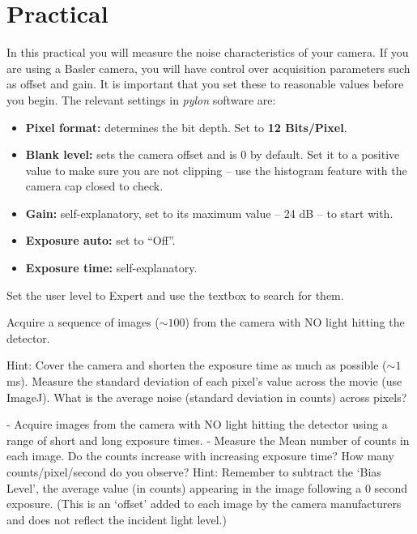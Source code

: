 \documentclass[a4paper]{report}
\newcommand{\nexercise}[0]{\arabic{exercises}\addtocounter{exercises}{1}}
\begin{document}
\section{Practical}
In this practical you will measure the noise characteristics of your camera. 
If you are using a Basler camera, you will have control over acquisition parameters such as offset and gain. 
It is important that you set these to reasonable values before you begin. 
The relevant settings in \textit{pylon} software are:
\begin{itemize}
	\item \textbf{Pixel format:} determines the bit depth. Set to \textbf{12 Bits/Pixel}.
	\item \textbf{Blank level:} sets the camera offset and is 0 by default. Set it to a positive value to make sure you are not clipping -- use the histogram feature with the camera cap closed to check.
	\item \textbf{Gain:} self-explanatory, set to its maximum value -- 24 dB -- to start with.
	\item \textbf{Exposure auto:} set to ``Off''.
	\item \textbf{Exposure time:} self-explanatory.
\end{itemize}
Set the user level to Expert and use the textbox to search for them. 
\begin{exercisebox}[frametitle={Exercise \nexercise: Measure read-out noise}]
Acquire a sequence of images ($\sim100$) from the camera with NO light hitting the detector. 

Hint: Cover the camera and shorten the exposure time as much as possible ($\sim1$ ms). Measure the standard deviation of each pixel’s value across the movie (use ImageJ). 
What is the average noise (standard deviation in counts) across pixels? 
\end{exercisebox}

\begin{exercisebox}[frametitle={Exercise \nexercise: Measure dark counts}]
- Acquire images from the camera with NO light hitting the detector using a range of short and long exposure times.
- Measure the Mean number of counts in each image. Do the counts increase with increasing exposure time? How many counts/pixel/second do you observe? 
Hint: Remember to subtract the ‘Bias Level’, the average value (in counts) appearing in the image following a 0 second exposure. (This is an ‘offset’ added to each image by the camera manufacturers and does not reflect the incident light level.) 
\end{exercisebox}
\end{document}
